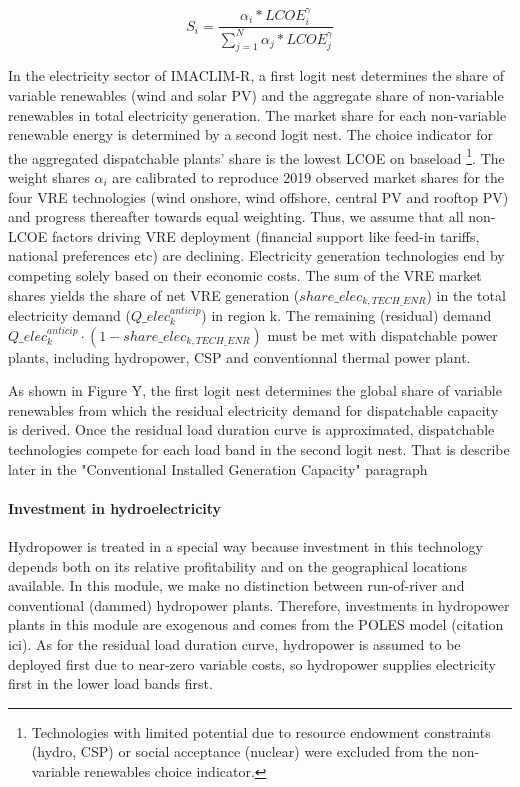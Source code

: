 \begin{dmath}
    S_{i} = \frac{\alpha_{i}*LCOE_{i}^{\gamma}}{\sum_{j=1}^{N} \alpha_{j}*LCOE_{j}^{\gamma}}
    \label{eqn:MMLFVRE}
\end{dmath}

In the electricity sector of IMACLIM-R, a first logit nest determines the share of variable renewables (wind and solar PV) and the aggregate share of non-variable renewables in total electricity generation. The market share for each non-variable renewable energy is determined by a second logit nest.
 The choice indicator for the aggregated dispatchable plants’ share is the lowest LCOE on baseload 
\footnote{Technologies with limited potential due to resource endowment constraints (hydro, CSP) or social acceptance (nuclear) were excluded from the non-variable renewables choice indicator.}. The weight shares $\alpha_{i}$ are calibrated to reproduce 2019 observed market shares for the four VRE technologies (wind onshore, wind offshore, central PV and rooftop PV) and progress thereafter towards equal weighting. Thus, we assume that all non-LCOE factors driving VRE deployment (financial support like feed-in tariffs, national preferences etc) are declining. Electricity generation technologies end by competing solely based on their economic costs.
The sum of the VRE market shares yields the share of net VRE generation ($share\_elec_{k,TECH\_ENR}$) in the total electricity demand ($Q\_elec_k^{anticip}$)  in region k. The remaining (residual) demand $Q\_elec_k^{anticip} \cdot (1-share\_elec_{k,TECH\_ENR})$ must be met with dispatchable power plants, including hydropower, CSP and conventionnal thermal power plant.

As shown in Figure Y, the first logit nest determines the global share of variable renewables from which the residual electricity demand for dispatchable capacity is derived. Once the residual load duration curve is approximated, dispatchable technologies compete for each load band in the second logit nest. That is describe later in the "Conventional Installed Generation Capacity" paragraph


\paragraph{Investment in hydroelectricity}

Hydropower is treated in a special way because investment in this technology depends both on its relative profitability and on the  geographical locations available.
In this module, we make no distinction between run-of-river and conventional (dammed) hydropower plants. Therefore, investments in hydropower plants in this module are exogenous and comes from the POLES model (citation ici).
As for the residual load duration curve, hydropower is assumed to be deployed first due to near-zero variable costs, so hydropower supplies electricity first in the lower load bands first.


